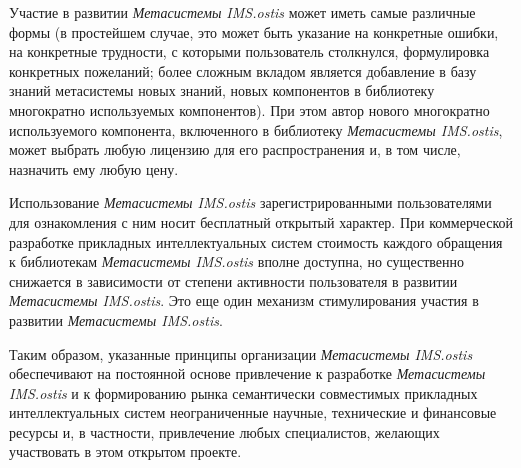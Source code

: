 \begin{SCn}
{\begin{scnitemize}
		\item Участие в развитии \textit{Метасистемы IMS.ostis} может иметь самые различные формы (в простейшем случае, это может быть указание на конкретные ошибки, на конкретные трудности, с которыми пользователь столкнулся, формулировка конкретных пожеланий; более сложным вкладом является добавление в базу знаний метасистемы новых знаний, новых компонентов в библиотеку многократно используемых компонентов). При этом автор нового многократно используемого компонента, включенного в библиотеку \textit{Метасистемы IMS.ostis}, может выбрать любую лицензию для его распространения и, в том числе, назначить ему любую цену.
		\item Использование \textit{Метасистемы IMS.ostis} зарегистрированными пользователями  для ознакомления с ним носит бесплатный открытый характер. При коммерческой разработке прикладных интеллектуальных систем стоимость каждого обращения к библиотекам \textit{Метасистемы IMS.ostis} вполне доступна, но существенно снижается в зависимости от степени активности пользователя в развитии \textit{Метасистемы IMS.ostis}. Это еще один механизм стимулирования участия в развитии \textit{Метасистемы IMS.ostis}.
	\end{scnitemize}
	
	Таким образом, указанные принципы организации \textit{Метасистемы IMS.ostis} обеспечивают на постоянной основе привлечение к разработке \textit{Метасистемы IMS.ostis} и к формированию рынка семантически совместимых прикладных интеллектуальных систем неограниченные научные, технические и финансовые ресурсы и, в частности, привлечение любых специалистов, желающих участвовать в этом открытом проекте.
}




\end{SCn}
